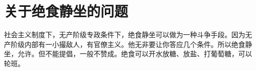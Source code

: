 \section[关于绝食静坐的问题（一九六七年六月二十九日）]{关于绝食静坐的问题}


社会主义制度下，无产阶级专政条件下，绝食静坐可以做为一种斗争手段。因为无产阶级内部有一小撮敌人，有官僚主义。他无非要让你答应几个条件。所以绝食静坐，允许。但不能提倡，一般不赞成。绝食可以开水放糖、放盐、打葡萄糖，可以轮班。

